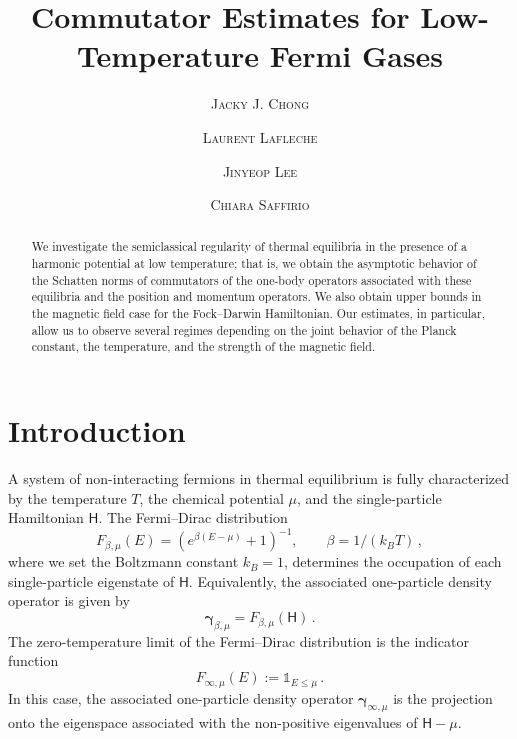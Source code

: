 \documentclass[11pt]{amsart}
\title[\textsc{Semiclassical Regularity at Low Temperature}]%
{\Large Commutator Estimates for Low-Temperature Fermi Gases}
\author[\textsc{J. Chong}]{\vspace{-10pt}\textsc{Jacky J. Chong}}
\author[\textsc{L. Lafleche}]{\vspace{-20pt}\textsc{Laurent Lafleche}}
\author[\textsc{J. Lee}]{\vspace{-20pt}\textsc{Jinyeop Lee}}
\author[\textsc{C. Saffirio}]{\vspace{-20pt}\textsc{Chiara Saffirio}}
\theoremstyle{plain}
\theoremstyle{definition}
\newcommand		\sfH		{\mathsf H}			%
\renewcommand	{\(}			{\lt(}
\renewcommand	{\)}			{\rt)}
\newcommand		{\indic}	{\mathds{1}}		%
\newcommand		{\opgam}	{{\boldsymbol{\gamma}}}	%
\begin{document}
\begin{abstract}
    We investigate the semiclassical regularity of thermal equilibria in the presence of a harmonic potential at low temperature; that is, we obtain the asymptotic behavior of the Schatten norms of commutators of the one-body operators associated with these equilibria and the position and momentum operators. We also obtain upper bounds in the magnetic field case for the Fock--Darwin Hamiltonian. Our estimates, in particular, allow us to observe several regimes depending on the joint behavior of the Planck constant, the temperature, and the strength of the magnetic field.
\end{abstract}

\begingroup
\def\uppercasenonmath#1{} %
\let\MakeUppercase\relax %
\maketitle
\thispagestyle{empty} %
\endgroup


\bigskip


\renewcommand{\contentsname}{\centerline{Table of Contents}}
\setcounter{tocdepth}{2}	%
\tableofcontents




\section{Introduction}

    A system of non-interacting fermions in thermal equilibrium is fully characterized by the temperature $T$, the chemical potential $\mu$, and the single-particle Hamiltonian $\sfH$. The Fermi--Dirac distribution
    \begin{equation*}
        F_{\beta,\mu}(E) = (e^{\beta(E - \mu)} + 1)^{-1}, \qquad \beta = 1/(k_B T) \, ,
    \end{equation*}
    where we set the Boltzmann constant $k_B = 1$, determines the occupation of each single-particle eigenstate of $\sfH$. Equivalently, the associated one-particle density operator is given by
    \begin{equation*}
        \opgam_{\beta, \mu} = F_{\beta,\mu}(\sfH) \, .
    \end{equation*}
    The zero-temperature limit of the Fermi--Dirac distribution is the indicator function
    \begin{equation*}
        F_{\infty,\mu}(E) := \indic_{E\leq\mu} \, .
    \end{equation*}
    In this case, the associated one-particle density operator $\opgam_{\infty,\mu}$ is the projection onto the eigenspace associated with the non-positive eigenvalues of $\sfH-\mu$.
    
\end{document}
